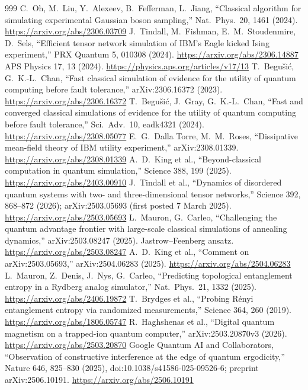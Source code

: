 \begin{thebibliography}{999}
 C.~Oh, M.~Liu, Y.~Alexeev, B.~Fefferman, L.~Jiang, ``Classical algorithm for simulating experimental Gaussian boson sampling,'' Nat.\ Phys.\ 20, 1461 (2024). \url{https://arxiv.org/abs/2306.03709}
 J.~Tindall, M.~Fishman, E.~M.~Stoudenmire, D.~Sels, ``Efficient tensor network simulation of IBM's Eagle kicked Ising experiment,'' PRX Quantum 5, 010308 (2024). \url{https://arxiv.org/abs/2306.14887}
 APS Physics 17, 13 (2024). \url{https://physics.aps.org/articles/v17/13}
 T.~Begu\v{s}i\'c, G.~K.-L.~Chan, ``Fast classical simulation of evidence for the utility of quantum computing before fault tolerance,'' arXiv:2306.16372 (2023). \url{https://arxiv.org/abs/2306.16372}
 T.~Begu\v{s}i\'c, J.~Gray, G.~K.-L.~Chan, ``Fast and converged classical simulations of evidence for the utility of quantum computing before fault tolerance,'' Sci.\ Adv.\ 10, eadk4321 (2024). \url{https://arxiv.org/abs/2308.05077}
 E.~G.~Dalla Torre, M.~M.~Roses, ``Dissipative mean-field theory of IBM utility experiment,'' arXiv:2308.01339. \url{https://arxiv.org/abs/2308.01339}
 A.~D.~King et al., ``Beyond-classical computation in quantum simulation,'' Science 388, 199 (2025). \url{https://arxiv.org/abs/2403.00910}
 J.~Tindall et al., ``Dynamics of disordered quantum systems with two- and three-dimensional tensor networks,'' Science 392, 868--872 (2026); arXiv:2503.05693 (first posted 7 March 2025). \url{https://arxiv.org/abs/2503.05693}
 L.~Mauron, G.~Carleo, ``Challenging the quantum advantage frontier with large-scale classical simulations of annealing dynamics,'' arXiv:2503.08247 (2025). Jastrow--Feenberg ansatz. \url{https://arxiv.org/abs/2503.08247}
 A.~D.~King et al., ``Comment on arXiv:2503.05693,'' arXiv:2504.06283 (2025). \url{https://arxiv.org/abs/2504.06283}
 L.~Mauron, Z.~Denis, J.~Nys, G.~Carleo, ``Predicting topological entanglement entropy in a Rydberg analog simulator,'' Nat.\ Phys.\ 21, 1332 (2025). \url{https://arxiv.org/abs/2406.19872}
 T.~Brydges et al., ``Probing R\'enyi entanglement entropy via randomized measurements,'' Science 364, 260 (2019). \url{https://arxiv.org/abs/1806.05747}
 R.~Haghshenas et al., ``Digital quantum magnetism on a trapped-ion quantum computer,'' arXiv:2503.20870v3 (2026). \url{https://arxiv.org/abs/2503.20870}
 Google Quantum AI and Collaborators, ``Observation of constructive interference at the edge of quantum ergodicity,'' Nature 646, 825--830 (2025), doi:10.1038/s41586-025-09526-6; preprint arXiv:2506.10191. \url{https://arxiv.org/abs/2506.10191}

\end{thebibliography}
